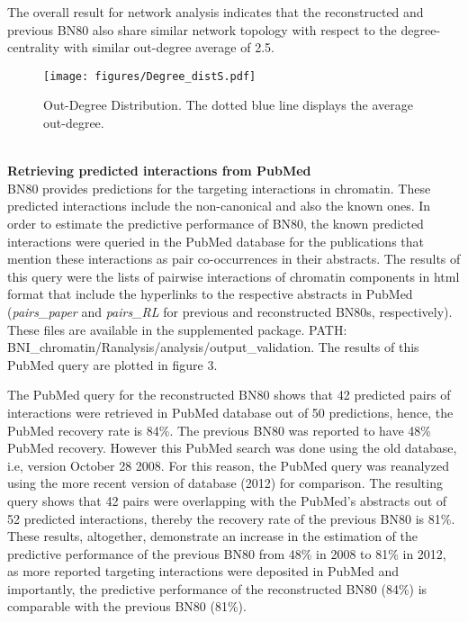 \documentclass{bioinfo}
\begin{document}
The overall result for network analysis indicates that the reconstructed and previous BN80 also share similar network topology with respect to the degree-centrality with similar out-degree average of 2.5.\\
\begin{figure}[!tpb]%
\centerline{\texttt{[image: figures/Degree\_distS.pdf]}}
\caption{Out-Degree Distribution. The dotted blue line displays the average out-degree.}\label{fig:02}
\end{figure}
\\
\textbf{Retrieving predicted interactions from PubMed}\\
BN80 provides predictions for the targeting interactions in chromatin. These predicted interactions include the non-canonical and also the known ones. In order to estimate the predictive performance of BN80, the known predicted interactions were queried in the PubMed database for the publications that mention these interactions as pair co-occurrences in their abstracts. The results of this query were the lists of pairwise interactions of chromatin components in html format that include the hyperlinks to the respective abstracts in PubMed (\textit{pairs\_paper} and \textit{pairs\_RL} for previous and reconstructed BN80s, respectively). These files are available in the supplemented package. PATH: BNI\_chromatin/Ranalysis/analysis/output\_validation. The results of this PubMed query are plotted in figure 3.

The PubMed query for the reconstructed BN80 shows that 42 predicted pairs of interactions were retrieved in PubMed database out of 50 predictions, hence, the PubMed recovery rate is 84\%. The previous BN80 was reported to have 48\% PubMed recovery. However this PubMed search was done using the old database, i.e, version October 28 2008. For this reason, the PubMed query was reanalyzed using the more recent version of database (2012) for comparison. The resulting query shows that 42 pairs were overlapping with the PubMed's abstracts out of 52 predicted interactions, thereby the recovery rate of the previous BN80 is 81\%. These results, altogether, demonstrate an increase in the estimation of the predictive performance of the previous BN80 from 48\% in 2008 to 81\% in 2012, as more reported targeting interactions were deposited in PubMed and importantly, the predictive performance of the reconstructed BN80 (84\%) is comparable with the previous BN80 (81\%). 
\end{document}
